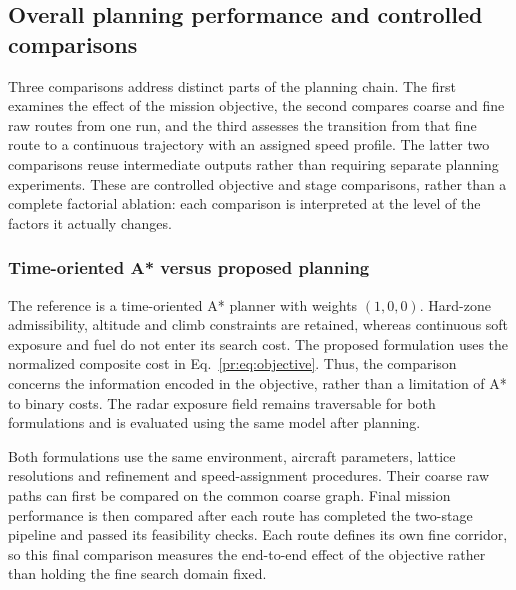 \subsection{Overall planning performance and controlled comparisons}
\label{sec:ablation}

Three comparisons address distinct parts of the planning chain. The first
examines the effect of the mission objective, the second compares coarse
and fine raw routes from one run, and the third assesses the transition
from that fine route to a continuous trajectory with an assigned speed
profile. The latter two comparisons reuse intermediate outputs rather
than requiring separate planning experiments. These are controlled objective
and stage comparisons, rather than a complete factorial ablation: each
comparison is interpreted at the level of the factors it actually changes.


\subsubsection{Time-oriented A* versus proposed planning}
\label{sec:objective_comparison}

The reference is a time-oriented A* planner with weights $(1,0,0)$.
Hard-zone admissibility, altitude and climb constraints are retained,
whereas continuous soft exposure and fuel do not enter its search cost.
The proposed formulation uses the normalized composite cost in
Eq.~\eqref{pr:eq:objective}. Thus, the comparison concerns the information
encoded in the objective, rather than a limitation of A* to binary costs.
The radar exposure field remains traversable for both formulations and
is evaluated using the same model after planning.

Both formulations use the same environment, aircraft parameters, lattice
resolutions and refinement and speed-assignment procedures. Their coarse
raw paths can first be compared on the common coarse graph. Final mission
performance is then compared after each route has completed the two-stage
pipeline and passed its feasibility checks. Each route defines its own
fine corridor, so this final comparison measures the end-to-end effect
of the objective rather than holding the fine search domain fixed.

